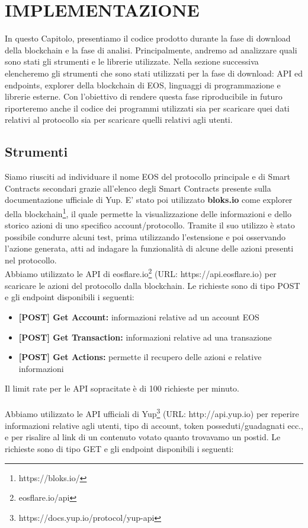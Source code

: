 \chapter{IMPLEMENTAZIONE}
\label{chapter_implementazione}
In questo Capitolo, presentiamo il codice prodotto durante la fase di download della blockchain e la fase di analisi. Principalmente, andremo ad analizzare quali sono stati gli strumenti e le librerie utilizzate.
Nella sezione successiva elencheremo gli strumenti che sono stati utilizzati per la fase di download: API ed endpoints, explorer della blockchain di EOS, linguaggi di programmazione e librerie esterne. Con l'obiettivo di rendere questa fase riproducibile in futuro riporteremo anche il codice dei programmi utilizzati sia per scaricare quei dati relativi al protocollo sia per scaricare quelli relativi agli utenti.

\section{Strumenti}
Siamo riusciti ad individuare il nome EOS del protocollo principale e di Smart Contracts secondari grazie all'elenco degli Smart Contracts presente sulla documentazione ufficiale di Yup. E' stato poi utilizzato \textbf{bloks.io} come explorer della blockchain\footnote{https://bloks.io/}, il quale permette la visualizzazione delle informazioni e dello storico azioni di uno specifico account/protocollo. Tramite il suo utilizzo è stato possibile condurre alcuni test, prima utilizzando l'estensione e poi osservando l'azione generata, atti ad indagare la funzionalità di alcune delle azioni presenti nel protocollo. \\
Abbiamo utilizzato le API di eosflare.io\footnote{eosflare.io/api} (URL: https://api.eosflare.io) per scaricare le azioni del protocollo dalla blockchain. Le richieste sono di tipo POST e gli endpoint disponibili i seguenti:

\begin{itemize}
    \item \textbf{[POST] Get Account:} informazioni relative ad un account EOS
    \item \textbf{[POST] Get Transaction:} informazioni relative ad una transazione
    \item \textbf{[POST] Get Actions:} permette il recupero delle azioni e relative informazioni
\end{itemize}

Il limit rate per le API sopracitate è di 100 richieste per minuto.
\\
\\
Abbiamo utilizzato le API ufficiali di Yup\footnote{https://docs.yup.io/protocol/yup-api} (URL: http://api.yup.io) per reperire informazioni relative agli utenti, tipo di account, token posseduti/guadagnati ecc., e per risalire al link di un contenuto votato quanto trovavamo un postid.
Le richieste sono di tipo GET e gli endpoint disponibili i seguenti:


